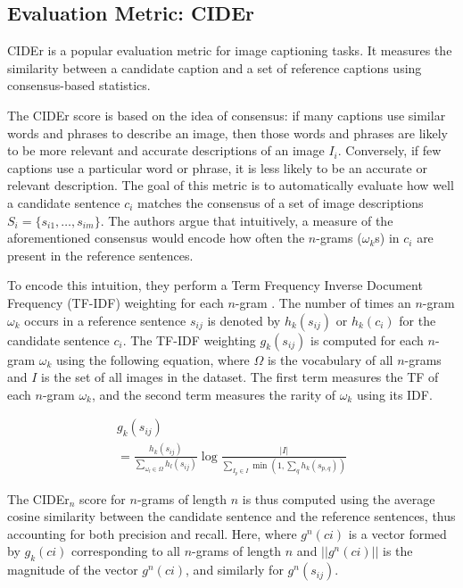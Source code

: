 \documentclass[11pt]{article}
\begin{document}
\subsection{Evaluation Metric: CIDEr}

CIDEr \cite{vedantam2015cider} is a popular evaluation metric for image captioning tasks. It measures the similarity between a candidate caption and a set of reference captions using consensus-based statistics.

The CIDEr score is based on the idea of consensus: if many captions use similar words and phrases to describe an image, then those words and phrases are likely to be more relevant and accurate descriptions of an image $I_i$. Conversely, if few captions use a particular word or phrase, it is less likely to be an accurate or relevant description. The goal of this metric is to automatically evaluate how well a candidate sentence $c_i$ matches the consensus of a set of image descriptions $S_i = \{s_{i1}, \ldots, s_{im}\}$. The authors argue that intuitively, a measure of the aforementioned consensus would encode how often the $n$-grams ($\omega_k$s) in $c_i$ are present in the reference sentences.

To encode this intuition, they perform a Term Frequency Inverse Document Frequency (TF-IDF) weighting for each $n$-gram \cite{Robertson2004}. The number of times an $n$-gram $\omega_k$ occurs in a reference sentence $s_{ij}$ is denoted by $h_k(s_{ij})$ or $h_k(c_i)$ for the candidate sentence $c_i$. The TF-IDF weighting $g_k(s_{ij})$ is computed for each $n$-gram $\omega_k$ using the following equation, where $\Omega$ is the vocabulary of all $n$-grams and $I$ is the set of all images in the dataset. The first term measures the TF of each $n$-gram $\omega_k$, and the second term measures the rarity of $\omega_k$ using its IDF.

\begin{equation*}
\begin{gathered}
    g_k(s_{ij}) \\
    = \frac{h_k(s_{ij})}{\sum_{\omega_l\in\Omega}h_l(s_{ij})}
    \log\frac{|I|}{\sum_{I_p\in I}\min\left(1,\sum_q h_k(s_{p,q})\right)}
\end{gathered}
\end{equation*}

The CIDEr$_n$ score for $n$-grams of length $n$ is thus computed using the average cosine similarity between the candidate sentence and the reference sentences, thus accounting for both precision and recall. Here, where $g^n(ci)$ is a vector formed by $g_k(ci)$ corresponding to all $n$-grams of length $n$ and $||g^n(ci)||$ is the magnitude of the vector $g^n(ci)$, and similarly for $g^n(s_{ij})$.
\end{document}

